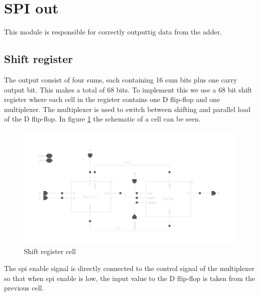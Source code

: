  \newpage
\section{SPI out}
This module is responsible for correctly outputtig data from the adder.


\subsection{Shift register}
The output consist of four sums, each containing 16 sum bits plus one carry output bit. This makes a total of 68 bits. To implement this we use a 68 bit shift register where each cell in the register contains one D flip-flop and one multiplexer. The multiplexer is used to switch between shifting and parallel load of the D flip-flop. In figure \ref{mux_dff} the schematic of a cell can be seen. 

\begin{figure}[H]
\centering
\captionsetup{justification=centering}
\includegraphics[scale=0.2]{../figures/mux_dffsr.png}
\caption{Shift register cell}
\label{mux_dff}
\end{figure}

\raggedright The spi enable signal is directly connected to the control signal of the multiplexer so that when spi enable is low, the input value to the D flip-flop is taken from the previous cell. 
 


\newpage


